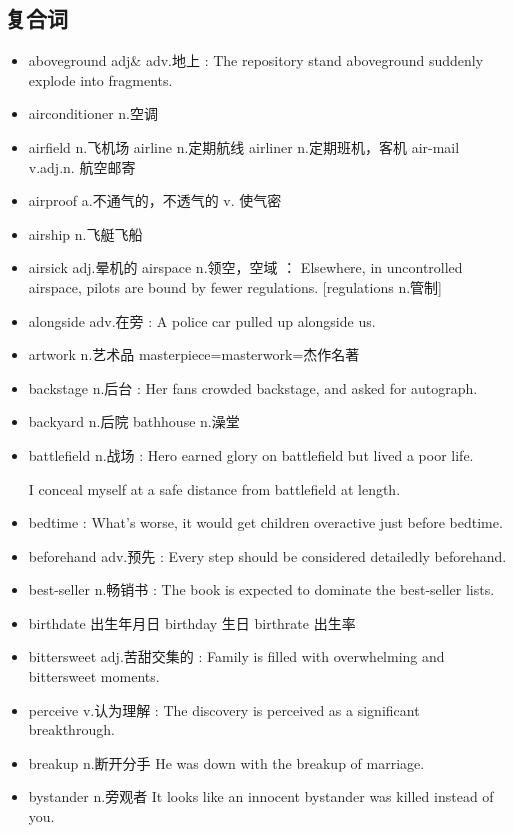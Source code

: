 \documentclass[utf8]{ctexart}
\begin{document}
		\subsection{复合词}
		\begin{itemize}
				\item aboveground adj\& adv.地上 : The repository stand aboveground suddenly explode into fragments.
				\item airconditioner n.空调
				\item airfield n.飞机场 airline n.定期航线 airliner n.定期班机，客机 air-mail v.adj.n. 航空邮寄 
				\item airproof a.不通气的，不透气的 v. 使气密
				\item airship n.飞艇飞船
				\item airsick adj.晕机的  airspace n.领空，空域 ： Elsewhere, in uncontrolled airspace, pilots are bound 
						by fewer regulations.  [regulations n.管制]
				\item alongside adv.在旁 : A police car pulled up alongside us.
				\item artwork n.艺术品 masterpiece=masterwork=杰作名著
				\item backstage n.后台 : Her fans crowded backstage, and asked for autograph.
				\item backyard n.后院 bathhouse n.澡堂
				\item 		battlefield n.战场 : Hero earned glory on battlefield but lived a poor life.
				\par I conceal myself at a safe distance from battlefield at length.
		            \item bedtime  : What's worse, it would get children overactive just before bedtime. 	
		            \item beforehand adv.预先 : Every step should be considered detailedly beforehand.
		            \item best-seller n.畅销书 : The book is expected to dominate the best-seller lists.
		            \item birthdate 出生年月日 birthday 生日 birthrate 出生率			
					\item bittersweet adj.苦甜交集的 : Family is filled with overwhelming and bittersweet moments.
					\item perceive v.认为理解 : The discovery is perceived as a significant breakthrough.
					\item breakup n.断开分手 He was down with the breakup of marriage.
					\item bystander n.旁观者  It looks like an innocent bystander was killed instead of you.

\end{itemize}
\end{document}

